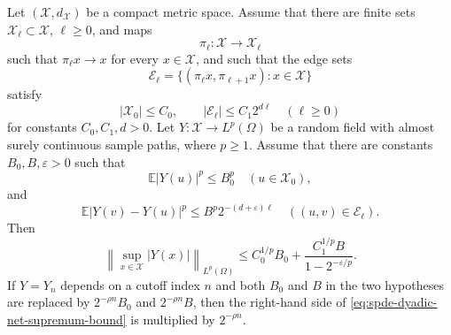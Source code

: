 \begin{theorem}
\label{thm:spde-dyadic-net-supremum-upgrade}
Let \((\mathcal X,d_{\mathcal X})\) be a compact metric space.  Assume that
there are finite sets \(\mathcal X_\ell\subset\mathcal X\),
\(\ell\geq0\), and maps
\[
  \pi_\ell:\mathcal X\to\mathcal X_\ell
\]
such that \(\pi_\ell x\to x\) for every \(x\in\mathcal X\), and such that
the edge sets
\[
  \mathcal E_\ell
  =
  \{(\pi_\ell x,\pi_{\ell+1}x):x\in\mathcal X\}
\]
satisfy
\[
  |\mathcal X_0|\leq C_0,\qquad
  |\mathcal E_\ell|\leq C_1 2^{d\ell}
  \quad(\ell\geq0)
\]
for constants \(C_0,C_1,d>0\).  Let \(Y:\mathcal X\to L^p(\Omega)\) be a
random field with almost surely continuous sample paths, where \(p\geq1\).
Assume that there are constants \(B_0,B,\varepsilon>0\) such that
\[
  \mathbb E|Y(u)|^p\leq B_0^p
  \quad(u\in\mathcal X_0),
\]
and
\begin{equation}
  \mathbb E|Y(v)-Y(u)|^p
  \leq
  B^p2^{-(d+\varepsilon)\ell}
  \quad((u,v)\in\mathcal E_\ell).
  \label{eq:spde-dyadic-net-increment-bound}
\end{equation}
Then
\begin{equation}
  \left\|
    \sup_{x\in\mathcal X}|Y(x)|
  \right\|_{L^p(\Omega)}
  \leq
  C_0^{1/p}B_0
  +
  \frac{C_1^{1/p}B}{1-2^{-\varepsilon/p}} .
  \label{eq:spde-dyadic-net-supremum-bound}
\end{equation}
If \(Y=Y_n\) depends on a cutoff index \(n\) and both \(B_0\) and \(B\) in
the two hypotheses are replaced by \(2^{-\rho n}B_0\) and
\(2^{-\rho n}B\), then the right-hand side of
\eqref{eq:spde-dyadic-net-supremum-bound} is multiplied by \(2^{-\rho n}\).
\end{theorem}

